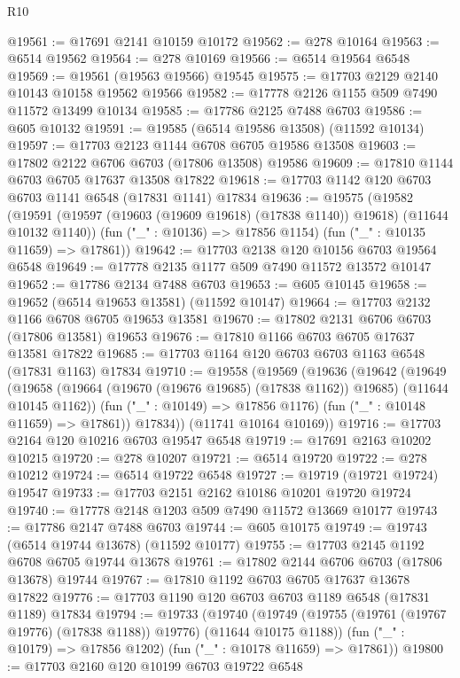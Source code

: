\begin{lexlean}{R10}
\begin{coremodule}
@19561 := @17691 @2141 @10159 @10172
@19562 := @278 @10164
@19563 := @6514 @19562
@19564 := @278 @10169
@19566 := @6514 @19564 @6548
@19569 := @19561 (@19563 @19566) @19545
@19575 := @17703 @2129 @2140 @10143 @10158 @19562 @19566
@19582 := @17778 @2126 @1155 @509 @7490 @11572 @13499 @10134
@19585 := @17786 @2125 @7488 @6703
@19586 := @605 @10132
@19591 := @19585 (@6514 @19586 @13508) (@11592 @10134)
@19597 := @17703 @2123 @1144 @6708 @6705 @19586 @13508
@19603 := @17802 @2122 @6706 @6703 (@17806 @13508) @19586
@19609 := @17810 @1144 @6703 @6705 @17637 @13508 @17822
@19618 := @17703 @1142 @120 @6703 @6703 @1141 @6548 (@17831 @1141) @17834
@19636 := @19575
    (@19582
      (@19591 (@19597 (@19603 (@19609 @19618) (@17838 @1140)) @19618) (@11644 @10132 @1140))
      (fun ("_" : @10136) => @17856 @1154)
      (fun ("_" : @10135 @11659) => @17861))
@19642 := @17703 @2138 @120 @10156 @6703 @19564 @6548
@19649 := @17778 @2135 @1177 @509 @7490 @11572 @13572 @10147
@19652 := @17786 @2134 @7488 @6703
@19653 := @605 @10145
@19658 := @19652 (@6514 @19653 @13581) (@11592 @10147)
@19664 := @17703 @2132 @1166 @6708 @6705 @19653 @13581
@19670 := @17802 @2131 @6706 @6703 (@17806 @13581) @19653
@19676 := @17810 @1166 @6703 @6705 @17637 @13581 @17822
@19685 := @17703 @1164 @120 @6703 @6703 @1163 @6548 (@17831 @1163) @17834
@19710 := @19558
    (@19569
      (@19636
        (@19642
          (@19649
            (@19658 (@19664 (@19670 (@19676 @19685) (@17838 @1162)) @19685) (@11644 @10145 @1162))
            (fun ("_" : @10149) => @17856 @1176)
            (fun ("_" : @10148 @11659) => @17861))
          @17834))
      (@11741 @10164 @10169))
@19716 := @17703 @2164 @120 @10216 @6703 @19547 @6548
@19719 := @17691 @2163 @10202 @10215
@19720 := @278 @10207
@19721 := @6514 @19720
@19722 := @278 @10212
@19724 := @6514 @19722 @6548
@19727 := @19719 (@19721 @19724) @19547
@19733 := @17703 @2151 @2162 @10186 @10201 @19720 @19724
@19740 := @17778 @2148 @1203 @509 @7490 @11572 @13669 @10177
@19743 := @17786 @2147 @7488 @6703
@19744 := @605 @10175
@19749 := @19743 (@6514 @19744 @13678) (@11592 @10177)
@19755 := @17703 @2145 @1192 @6708 @6705 @19744 @13678
@19761 := @17802 @2144 @6706 @6703 (@17806 @13678) @19744
@19767 := @17810 @1192 @6703 @6705 @17637 @13678 @17822
@19776 := @17703 @1190 @120 @6703 @6703 @1189 @6548 (@17831 @1189) @17834
@19794 := @19733
    (@19740
      (@19749 (@19755 (@19761 (@19767 @19776) (@17838 @1188)) @19776) (@11644 @10175 @1188))
      (fun ("_" : @10179) => @17856 @1202)
      (fun ("_" : @10178 @11659) => @17861))
@19800 := @17703 @2160 @120 @10199 @6703 @19722 @6548

\end{coremodule}
\end{lexlean}
